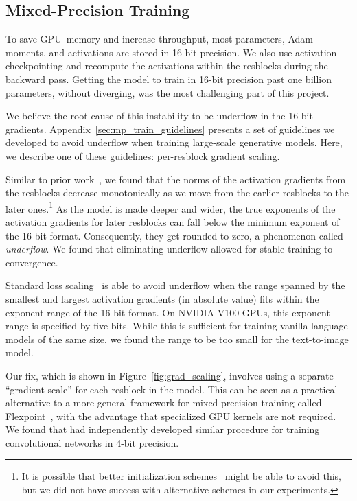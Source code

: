 \documentclass{article}
\begin{document}
\subsection{Mixed-Precision Training}
\label{sec:mp_train}

To save GPU~memory and increase throughput, most parameters, Adam moments, and activations are stored in 16-bit precision. We also use activation checkpointing and recompute the activations within the resblocks during the backward pass. Getting the model to train in 16-bit precision past one billion parameters, without diverging, was the most challenging part of this project.

We believe the root cause of this instability to be underflow in the 16-bit gradients. Appendix~\ref{sec:mp_train_guidelines} presents a set of guidelines we developed to avoid underflow when training large-scale generative models. Here, we describe one of these guidelines: per-resblock gradient scaling.

Similar to prior work~\cite{liu2020understanding}, we found that the norms of the activation gradients from the resblocks decrease monotonically as we move from the earlier resblocks to the later ones.\footnote{It is possible that better initialization schemes~\cite{liu2020understanding} might be able to avoid this, but we did not have success with alternative schemes in our experiments.} As the model is made deeper and wider, the true exponents of the activation gradients for later resblocks can fall below the minimum exponent of the 16-bit format. Consequently, they get rounded to zero, a phenomenon called \emph{underflow}. We found that eliminating underflow allowed for stable training to convergence.

Standard loss scaling~\cite{micikevicius2017mixed} is able to avoid underflow when the range spanned by the smallest and largest activation gradients (in absolute value) fits within the exponent range of the 16-bit format. On NVIDIA V100 GPUs, this exponent range is specified by five bits. While this is sufficient for training vanilla language models of the same size, we found the range to be too small for the text-to-image model.

Our fix, which is shown in Figure~\ref{fig:grad_scaling}, involves using a separate ``gradient scale'' for each resblock in the model. This can be seen as a practical alternative to a more general framework for mixed-precision training called Flexpoint~\cite{koster2017flexpoint}, with the advantage that specialized GPU kernels are not required. We found that \citet{sun2020ultra} had independently developed similar procedure for training convolutional networks in 4-bit precision.
\end{document}
